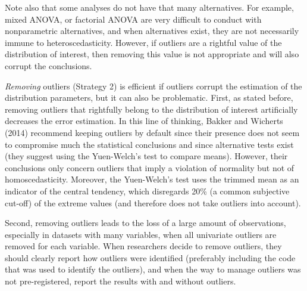 \documentclass[man,floatsintext]{apa6}
\begin{document}
Note also that some analyses do not have that many alternatives. For example, mixed ANOVA, or factorial ANOVA are very difficult to conduct with nonparametric alternatives, and when alternatives exist, they are not necessarily immune to heteroscedasticity. However, if outliers are a rightful value of the distribution of interest, then removing this value is not appropriate and will also corrupt the conclusions.

\emph{Removing} outliers (Strategy 2) is efficient if outliers corrupt the estimation of the distribution parameters, but it can also be problematic. First, as stated before, removing outliers that rightfully belong to the distribution of interest artificially decreases the error estimation. In this line of thinking, Bakker and Wicherts (2014) recommend keeping outliers by default since their presence does not seem to compromise much the statistical conclusions and since alternative tests exist (they suggest using the Yuen-Welch's test to compare means). However, their conclusions only concern outliers that imply a violation of normality but not of homoscedasticity. Moreover, the Yuen-Welch's test uses the trimmed mean as an indicator of the central tendency, which disregards 20\% (a common subjective cut-off) of the extreme values (and therefore does not take outliers into account).

Second, removing outliers leads to the loss of a large amount of observations, especially in datasets with many variables, when all univariate outliers are removed for each variable. When researchers decide to remove outliers, they should clearly report how outliers were identified (preferably including the code that was used to identify the outliers), and when the way to manage outliers was not pre-registered, report the results with and without outliers.
\end{document}
